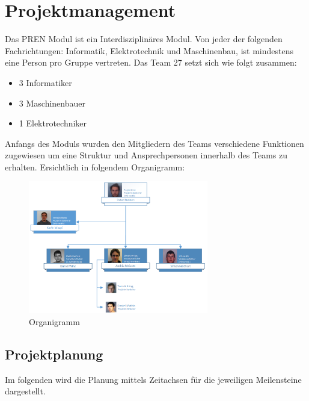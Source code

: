 \section{Projektmanagement}
Das PREN Modul ist ein Interdisziplinäres Modul. Von jeder der folgenden Fachrichtungen: Informatik, Elektrotechnik und Maschinenbau, ist mindestens eine Person pro Gruppe vertreten. Das Team 27 setzt sich wie folgt zusammen:
\begin{itemize}
	\item 3 Informatiker
	\item 3 Maschinenbauer
	\item 1 Elektrotechniker
\end{itemize}
Anfangs des Moduls wurden den Mitgliedern des Teams verschiedene Funktionen zugewiesen um eine Struktur und Ansprechpersonen innerhalb des Teams zu erhalten. Ersichtlich in folgendem Organigramm:
\begin{figure}[h!]
	\centering
	\includegraphics[width=0.7\textwidth]{fig/Organigramm.png}
	\caption{Organigramm}
	\label{fig:Organigramm}
\end{figure}

\subsection{Projektplanung}
Im folgenden wird die Planung mittels Zeitachsen für die jeweiligen Meilensteine dargestellt.

